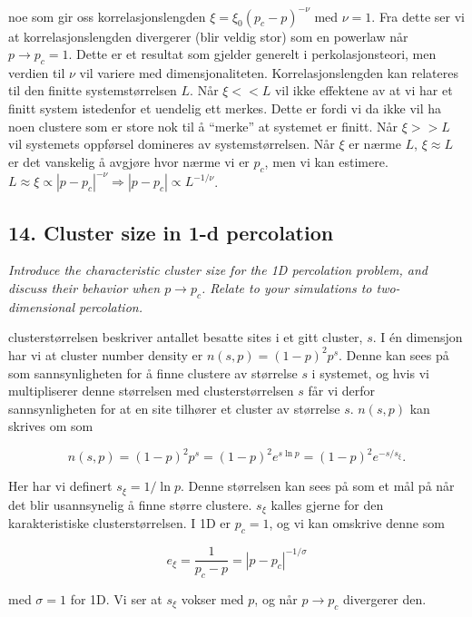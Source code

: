 \documentclass[a4paper,10pt]{article}
\begin{document}
noe som gir oss korrelasjonslengden $\xi = \xi_0(p_c-p)^{-\nu}$ med $\nu=1$. Fra dette ser vi at korrelasjonslengden divergerer (blir veldig stor) som en powerlaw når $p\rightarrow p_c=1$. Dette er et resultat som gjelder generelt i perkolasjonsteori, men verdien til $\nu$ vil variere med dimensjonaliteten. Korrelasjonslengden kan relateres til den finitte systemstørrelsen $L$. Når $\xi<<L$ vil ikke effektene av at vi har et finitt system istedenfor et uendelig ett merkes. Dette er fordi vi da ikke vil ha noen clustere som er store nok til å ``merke'' at systemet er finitt. Når $\xi>>L$ vil systemets oppførsel domineres av systemstørrelsen. Når $\xi$ er nærme $L$, $\xi\approx L$ er det vanskelig å avgjøre hvor nærme vi er $p_c$, men vi kan estimere. $L \approx \xi \propto |p-p_c|^{-\nu} \Rightarrow |p-p_c|\propto L^{-1/\nu}$. 



\subsection*{14. Cluster size in 1-d percolation}
\textit{Introduce the characteristic cluster size for the 1D percolation problem, and discuss their behavior when
$p \rightarrow p_c$. Relate to your simulations to two-dimensional percolation.}

clusterstørrelsen beskriver antallet besatte sites i et gitt cluster, $s$. I én dimensjon har vi at cluster number density er $n(s,p) = (1-p)^2p^s$. Denne kan sees på som sannsynligheten for å finne clustere av størrelse $s$ i systemet, og hvis vi multipliserer denne størrelsen med clusterstørrelsen $s$ får vi derfor sannsynligheten for at en site tilhører et cluster av størrelse $s$. $n(s,p)$ kan skrives om som

\begin{equation}
 n(s,p) = (1-p)^2p^s = (1-p)^2e^{s\ln p} = (1-p)^2e^{-s/s_{\xi}}.
\end{equation}

Her har vi definert $s_{\xi}=1/\ln p$. Denne størrelsen kan sees på som et mål på når det blir usannsynelig å finne større clustere. $s_{\xi}$ kalles gjerne for den karakteristiske clusterstørrelsen. I 1D er $p_c=1$, og vi kan omskrive denne som

\begin{equation}
 e_{\xi} = \frac{1}{p_c-p} = |p-p_c|^{-1/\sigma}
\end{equation}

med $\sigma=1$ for 1D. Vi ser at $s_{\xi}$ vokser med $p$, og når $p\rightarrow p_c$ divergerer den.
\end{document}

